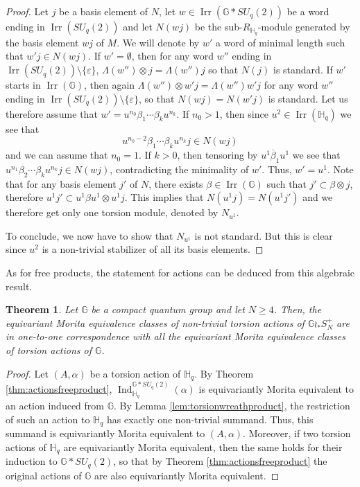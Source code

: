 \documentclass[a4paper, 11pt]{amsart}
\theoremstyle{plain}
\newtheorem{thm}{Theorem}[section]
\theoremstyle{definition}
\theoremstyle{remark}
\DeclareMathOperator{\Ind}{Ind}
\DeclareMathOperator{\Irr}{Irr}
\newcommand{\G}{\mathbb{G}}
\newcommand{\HH}{\mathbb{H}}
\begin{document}
\begin{proof}
Let $j$ be a basis element of $N$, let $w\in \Irr(\G\ast SU_{q}(2))$ be a word ending in $\Irr(SU_{q}(2))$ and let $N(wj)$ be the sub-$R_{\HH_{q}}$-module generated by the basis element $wj$ of $M$. We will denote by $w'$ a word of minimal length such that $w'j \in N(wj)$. If $w' = \emptyset$, then for any word $w''$ ending in $\Irr(SU_{q}(2))\setminus\{\varepsilon\}$, $\Lambda(w'')\otimes j = \Lambda(w'')j$ so that $N(j)$ is standard. If $w'$ starts in $\Irr(\G)$, then again $\Lambda(w'')\otimes w'j = \Lambda(w'')w'j$ for any word $w''$ ending in $\Irr(SU_{q}(2))\setminus\{\varepsilon\}$, so that $N(wj) = N(w'j)$ is standard. Let us therefore assume that $w' = u^{n_{0}}\beta_{1}\cdots\beta_{k}u^{n_{k}}$. If $n_{0} > 1$, then since $u^{2}\in \Irr(\HH_{q})$ we see that
\begin{equation*}
u^{n_{0}-2}\beta_{1}\cdots\beta_{k}u^{n_{k}}j\in N(wj)
\end{equation*}
and we can assume that $n_{0} = 1$. If $k>0$, then tensoring by $u^{1}\overline{\beta}_{1}u^{1}$ we see that $u^{n_{1}}\beta_{2}\cdots\beta_{k}u^{n_{k}}j\in N(wj)$, contradicting the minimality of $w'$. Thus, $w' = u^{1}$. Note that for any basis element $j'$ of $N$, there exists $\beta\in \Irr(\G)$ such that $j'\subset \beta\otimes j$, therefore $u^{1}j'\subset u^{1}\beta u^{1}\otimes u^{1}j$. This implies that $N(u^{1}j) = N(u^{1}j')$ and we therefore get only one torsion module, denoted by $N_{u^{1}}$.

To conclude, we now have to show that $N_{u^{1}}$ is not standard. But this is clear since $u^{2}$ is a non-trivial stabilizer of all its basis elements.
\end{proof}

As for free products, the statement for actions can be deduced from this algebraic result.

\begin{thm}\label{thm:torsionwreathproduct}
Let $\G$ be a compact quantum group and let $N\geqslant 4$. Then, the equivariant Morita equivalence classes of \emph{non-trivial} torsion actions of $\G\wr_{\ast}S_{N}^{+}$ are in one-to-one correspondence with \emph{all} the equivariant Morita equivalence classes of torsion actions of $\G$.
\end{thm}

\begin{proof}
Let $(A, \alpha)$ be a torsion action of $\HH_{q}$. By Theorem \ref{thm:actionsfreeproduct}, $\Ind_{\HH_{q}}^{\G\ast SU_{q}(2)}(\alpha)$ is equivariantly Morita equivalent to an action induced from $\G$. By Lemma \ref{lem:torsionwreathproduct}, the restriction of such an action to $\HH_{q}$ has exactly one non-trivial summand. Thus, this summand is equivariantly Morita equivalent to $(A, \alpha)$. Moreover, if two torsion actions of $\HH_{q}$ are equivariantly Morita equivalent, then the same holds for their induction to $\G\ast SU_{q}(2)$, so that by Theorem \ref{thm:actionsfreeproduct} the original actions of $\G$ are also equivariantly Morita equivalent.
\end{proof}
\end{document}
